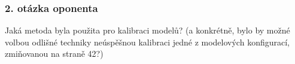 \documentclass[
	11pt, %
]{beamer}
\begin{document}
\begin{frame}[plain] %
	\frametitle{2. otázka oponenta}

Jaká metoda byla použita pro kalibraci modelů? (a konkrétně, bylo by možné volbou odlišné techniky neúspěšnou kalibraci jedné z modelových konfigurací, zmiňovanou na straně 42?)




\end{frame}
\end{document}

